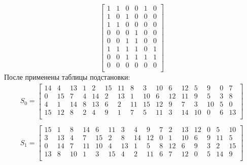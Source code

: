\documentclass[a4paper, 14pt]{extarticle}
\begin{document}
\begin{enumerate}
\begin{equation}
\begin{bmatrix}
            1   & 1   & 0   & 0   & 1   & 0   \\
            1   & 0   & 1   & 0   & 0   & 0   \\
            1   & 1   & 0   & 0   & 0   & 0   \\
            0   & 0   & 0   & 1   & 0   & 0   \\
            0   & 0   & 1   & 1   & 0   & 0   \\
            1   & 1   & 1   & 1   & 0   & 1   \\
            0   & 0   & 1   & 1   & 1   & 1   \\
            0   & 0   & 0   & 0   & 0   & 0   \\
        \end{bmatrix}
    \end{equation}
    После применены таблицы подстановки:
    \begin{equation}
        \begin{array}{c}
            S_0 = \begin{bmatrix}
                14  & 4   & 13  & 1   & 2   & 15  & 11  & 8   & 3   & 10  & 6   & 12  & 5   & 9   & 0   & 7   \\
                0   & 15  & 7   & 4   & 14  & 2   & 13  & 1   & 10  & 6   & 12  & 11  & 9   & 5   & 3   & 8   \\
                4   & 1   & 14  & 8   & 13  & 6   & 2   & 11  & 15  & 12  & 9   & 7   & 3   & 10  & 5   & 0   \\
                15  & 12  & 8   & 2   & 4   & 9   & 1   & 7   & 5   & 11  & 3   & 14  & 10  & 0   & 6   & 13  \\
            \end{bmatrix}\\
            \\ 
            S_1 = \begin{bmatrix}
                15  & 1   & 8   & 14  & 6   & 11  & 3   & 4   & 9   & 7   & 2   & 13  & 12  & 0   & 5   & 10  \\
                3   & 13  & 4   & 7   & 15  & 2   & 8   & 14  & 12  & 0   & 1   & 10  & 6   & 9   & 11  & 5   \\
                0   & 14  & 7   & 11  & 10  & 4   & 13  & 1   & 5   & 8   & 12  & 6   & 9   & 3   & 2   & 15  \\
                13  & 8   & 10  & 1   & 3   & 15  & 4   & 2   & 11  & 6   & 7   & 12  & 0   & 5   & 14  & 9   \\
            \end{bmatrix}\\

\end{array}
\end{equation}
\end{enumerate}
\end{document}
